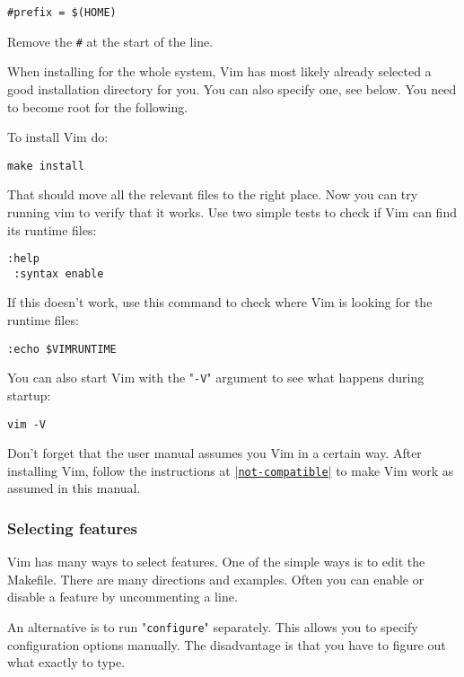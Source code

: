 \begin{Verbatim}[samepage=true]
    #prefix = $(HOME) 
\end{Verbatim}

Remove the \verb!#! at the start of the line.

When installing for the whole system, Vim has most likely already selected a good installation directory for you.
You can also specify one, see below.
You need to become root for the following.

To install Vim do:

\begin{Verbatim}[samepage=true]
 make install
\end{Verbatim}

That should move all the relevant files to the right place.
Now you can try running vim to verify that it works.
Use two simple tests to check if Vim can find its runtime files:

\begin{Verbatim}[samepage=true]
 :help
 :syntax enable
\end{Verbatim}

If this doesn't work, use this command to check where Vim is looking for the runtime files:

\begin{Verbatim}[samepage=true]
 :echo $VIMRUNTIME
\end{Verbatim}

You can also start Vim with the "\verb!-V!" argument to see what happens during startup:

\begin{Verbatim}[samepage=true]
 vim -V
\end{Verbatim}

Don't forget that the user manual assumes you Vim in a certain way.
After installing Vim, follow the instructions at \hyperref[not-compatible]{|\texttt{not-compatible}|} to make Vim work as assumed in this manual.

\subsubsection{Selecting features}
Vim has many ways to select features.
One of the simple ways is to edit the Makefile.
There are many directions and examples.
Often you can enable or disable a feature by uncommenting a line.

An alternative is to run "\verb!configure!" separately.
This allows you to specify configuration options manually.
The disadvantage is that you have to figure out what exactly to type.

